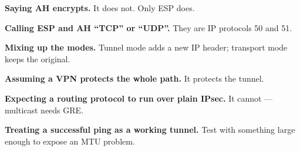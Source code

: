 \begin{pitfall}
\begin{tight}
  \item \textbf{Saying AH encrypts.} It does not. Only ESP does.
  \item \textbf{Calling ESP and AH ``TCP'' or ``UDP''.} They are IP protocols 50
        and 51.
  \item \textbf{Mixing up the modes.} Tunnel mode adds a new IP header; transport
        mode keeps the original.
  \item \textbf{Assuming a VPN protects the whole path.} It protects the tunnel.
  \item \textbf{Expecting a routing protocol to run over plain IPsec.} It cannot
        --- multicast needs GRE.
  \item \textbf{Treating a successful ping as a working tunnel.} Test with
        something large enough to expose an MTU problem.
\end{tight}
\end{pitfall}

